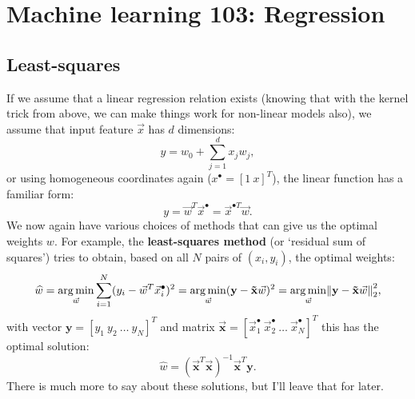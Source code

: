 \documentclass{article}
\DeclarePairedDelimiter\norm{\lVert}{\rVert}%
\DeclareMathOperator*{\argmin}{arg\,min}
\begin{document}
\newpage
\section{Machine learning 103: Regression}
\subsection{Least-squares}
If we assume that a linear regression relation exists (knowing that with the kernel trick from above, we can make things work for non-linear models also), we assume that input feature $\vec{x}$ has $d$ dimensions:
\begin{equation}
    y = w_0 + \sum_{j=1}^d x_j w_j,
\end{equation}
or using homogeneous coordinates again ($x^\bullet=[1\ x]^T$), the linear function has a familiar form:
\begin{equation}
    y = \vec{w}^T\vec{x}^\bullet = \vec{x}^{\bullet T}\vec{w}.\label{eq:standardlinearform}
\end{equation}
We now again have various choices of methods that can give us the optimal weights $w$. For example, the \textbf{least-squares method} (or `residual sum of squares') tries to obtain, based on all $N$ pairs of $(x_i,y_i)$, the optimal weights:
\begin{equation}
    \widehat{w} = \argmin_{\vec{w}} \sum_{i=1}^N (y_i - \vec{w}^T\vec{x}^\bullet_i)^2 = \argmin_{\vec{w}} (\mathbf{y}-\mathbf{\vec{x}}\vec{w})^2 = \argmin_{\vec{w}} \norm*{\mathbf{y}-\mathbf{\vec{x}}\vec{w}}_2^2,
\end{equation}
with vector $\mathbf{y}=[y_1\ y_2\ \dots\ y_N]^T$ and matrix $\mathbf{\vec{x}}=[\vec{x}_1^{\bullet}\ \vec{x}^{\bullet}_2\ \dots\ \vec{x}^{\bullet}_N]^T$ this has the optimal solution:
\begin{equation}
    \widehat{w} = (\mathbf{\vec{x}}^{T}\mathbf{\vec{x}})^{-1} \mathbf{\vec{x}}^{T}\mathbf{y}.
\end{equation}
There is much more to say about these solutions, but I'll leave that for later.
\end{document}
